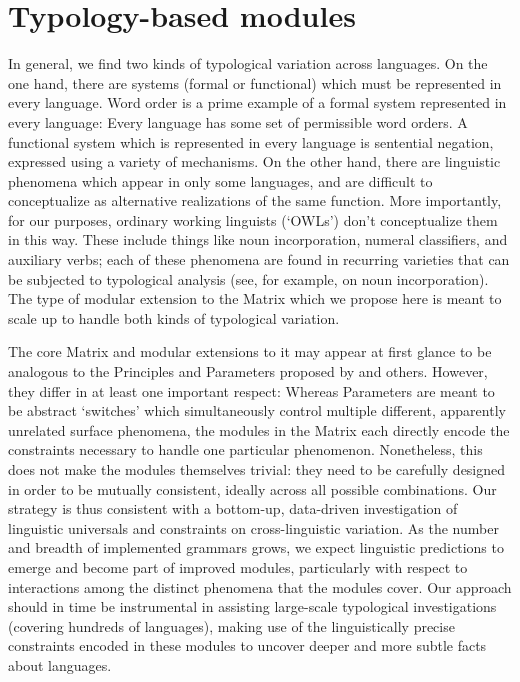 \documentclass[11pt]{article}
\begin{document}
\section{Typology-based modules}

In general, we find two kinds of typological variation across
languages.  On the one hand, there are systems (formal or functional)
which must be represented in every language.  Word order is a prime
example of a formal system represented in every language: Every
language has some set of permissible word orders.
A functional system which is represented in every language is
sentential negation, expressed using a variety of mechanisms.  On 
the other hand, there are linguistic
phenomena which appear in only some languages, and are difficult to
conceptualize as alternative realizations of the same function.  More
importantly, for our purposes, ordinary working linguists (`OWLs')
don't conceptualize them in this way.  These include things like
noun incorporation, numeral classifiers, and auxiliary verbs; each of
these phenomena are found in recurring varieties that can be 
subjected to typological
analysis (see, for example, \cite{Mithun:84} on noun incorporation).
The type of modular extension to the Matrix which we propose here
is meant to scale up to handle both kinds of typological variation.

The core Matrix and modular extensions to it may appear at first
glance to be analogous to the Principles and Parameters proposed
by  and others.
However, they differ in at least one important respect:
Whereas Parameters are meant to be abstract `switches'
which simultaneously control multiple different, apparently 
unrelated surface phenomena, the modules in the Matrix each directly
encode the constraints necessary to handle one particular phenomenon.
Nonetheless, this does not make the modules themselves trivial:
they need to be carefully designed in order to be mutually
consistent, ideally across all possible combinations.  Our strategy
is thus consistent with a
bottom-up, data-driven investigation of linguistic universals and
constraints on cross-linguistic variation.  As the number and breadth
of implemented grammars grows, we expect linguistic predictions to 
emerge and become part of improved modules, particularly with respect
to interactions among the distinct phenomena that the modules cover.
Our approach should in time be instrumental in assisting large-scale 
typological investigations (covering hundreds of languages), making use
of the linguistically precise constraints encoded in these modules to
uncover deeper and more subtle facts about languages.
\end{document}
